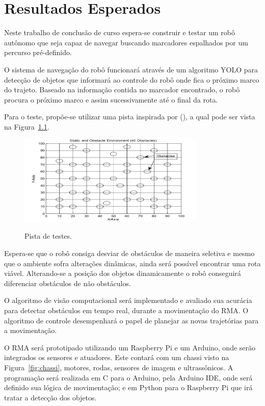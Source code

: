 \chapter{Resultados Esperados}
\label{chap:ResultadosEsperados}

Neste trabalho de conclusão de curso espera-se construir e testar um robô autônomo que seja capaz de navegar buscando marcadores espalhados por um percurso pré-definido. 

O sistema de navegação do robô funcionará através de um algoritmo YOLO para detecção de objetos que informará ao controle do robô onde fica o próximo marco do trajeto. Baseado na informação contida no marcador encontrado, o robô procura o próximo marco e assim sucessivamente até o final da rota.

Para o teste, propõe-se utilizar uma pista inspirada por \citeauthor{memon2015autonomous} (\citeyear{memon2015autonomous}), a qual pode ser vista na Figura~\ref{fig:pista-testes}.

\begin{figure}[!hbtp]
  \centering
   \caption{Pista de testes.}
    \includegraphics[width = 0.8\textwidth]{Caps/Figs/resultados/pista.png}
   \label{fig:pista-testes}
\end{figure}

Espera-se que o robô consiga desviar de obstáculos de maneira seletiva e mesmo que o ambiente sofra alterações dinâmicas, ainda será possível encontrar uma rota viável. Alterando-se a posição dos objetos dinamicamente o robô conseguirá diferenciar obstáculos de não obstáculos.

O algoritmo de visão computacional será implementado e avaliado sua acurácia para detectar obstáculos em tempo real, durante a movimentação do RMA. O algoritmo de controle desempenhará o papel de planejar as novas trajetórias para a movimentação.

O RMA será prototipado utilizando um Raspberry Pi e um Arduino, onde serão integrados os sensores e atuadores. Este contará com um chassi visto na Figura~\ref{fig:chassi}, motores, rodas, sensores de imagem e ultrassônicos. A programação será realizada em C para o Arduino, pela Arduino IDE, onde será definido sua lógica de movimentação; e em Python para o Raspberry Pi que irá tratar a detecção dos objetos.

